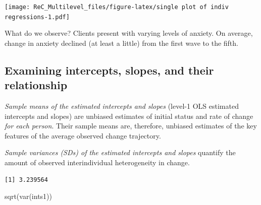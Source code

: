 \documentclass[
  11pt,
]{book}
\newenvironment{Shaded}{\begin{snugshade}}{\end{snugshade}}
\newcommand{\AttributeTok}[1]{\textcolor[rgb]{0.77,0.63,0.00}{#1}}
\newcommand{\CommentTok}[1]{\textcolor[rgb]{0.56,0.35,0.01}{\textit{#1}}}
\newcommand{\ConstantTok}[1]{\textcolor[rgb]{0.00,0.00,0.00}{#1}}
\newcommand{\ControlFlowTok}[1]{\textcolor[rgb]{0.13,0.29,0.53}{\textbf{#1}}}
\newcommand{\DecValTok}[1]{\textcolor[rgb]{0.00,0.00,0.81}{#1}}
\newcommand{\FunctionTok}[1]{\textcolor[rgb]{0.00,0.00,0.00}{#1}}
\newcommand{\NormalTok}[1]{#1}
\newcommand{\OtherTok}[1]{\textcolor[rgb]{0.56,0.35,0.01}{#1}}
\newcommand{\SpecialCharTok}[1]{\textcolor[rgb]{0.00,0.00,0.00}{#1}}
\begin{document}
\texttt{[image: ReC\_Multilevel\_files/figure-latex/single plot of indiv regressions-1.pdf]}

What do we observe? Clients present with varying levels of anxiety. On average, change in anxiety declined (at least a little) from the first wave to the fifth.

\hypertarget{examining-intercepts-slopes-and-their-relationship}{%
\subsection{Examining intercepts, slopes, and their relationship}\label{examining-intercepts-slopes-and-their-relationship}}

\emph{Sample means of the estimated intercepts and slopes} (level-1 OLS estimated intercepts and slopes) are unbiased estimates of initial status and rate of change \emph{for each person}. Their sample means are, therefore, unbiased estimates of the key features of the average observed change trajectory.

\emph{Sample variances (SDs) of the estimated intercepts and slopes} quantify the amount of observed interindividual heterogeneity in change.

\begin{Shaded}
\end{Shaded}

\begin{verbatim}
[1] 3.239564
\end{verbatim}

\begin{Shaded}
\begin{Highlighting}[]
\FunctionTok{sqrt}\NormalTok{(}\FunctionTok{var}\NormalTok{(ints1))}
\end{Highlighting}
\end{Shaded}
\end{document}
